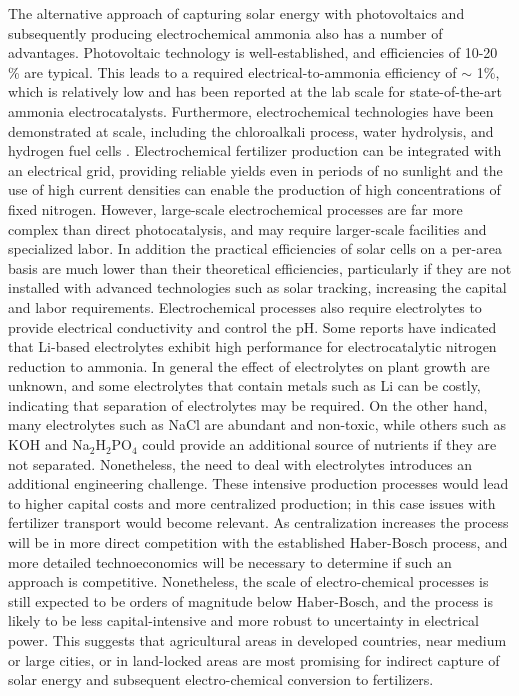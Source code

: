 The alternative approach of capturing solar energy with photovoltaics and subsequently producing electrochemical ammonia also has a number of advantages. Photovoltaic technology is well-established, and efficiencies of 10-20 \% are typical. This leads to a required electrical-to-ammonia efficiency of $\sim$ 1\%, which is relatively low and has been reported at the lab scale for state-of-the-art ammonia electrocatalysts.\cite{Liu2018,Qiu_2018,Song_2018,Zhang_2018,Luo_2018} Furthermore, electrochemical technologies have been demonstrated at scale, including the chloroalkali process, water hydrolysis, and hydrogen fuel cells\cite{Burney1993} \needcite. Electrochemical fertilizer production can be integrated with an electrical grid, providing reliable yields even in periods of no sunlight and the use of high current densities can enable the production of high concentrations of fixed nitrogen. However, large-scale electrochemical processes are far more complex than direct photocatalysis, and may require larger-scale facilities and specialized labor. In addition the practical efficiencies of solar cells on a per-area basis are much lower than their theoretical efficiencies, particularly if they are not installed with advanced technologies such as solar tracking, increasing the capital and labor requirements.\cite{MacKay_2013} Electrochemical processes also require electrolytes to provide electrical conductivity and control the pH. Some reports have indicated that Li-based electrolytes exhibit high performance for electrocatalytic nitrogen reduction to ammonia\cite{Song_2018,Mikosch_2005}. In general the effect of electrolytes on plant growth are unknown, and some electrolytes that contain metals such as Li can be costly, indicating that separation of electrolytes may be required. On the other hand, many electrolytes such as NaCl are abundant and non-toxic, while others such as KOH and Na$_2$H$_2$PO$_4$ could provide an additional source of nutrients if they are not separated. Nonetheless, the need to deal with electrolytes introduces an additional engineering challenge. These intensive production processes would lead to higher capital costs and more centralized production; in this case issues with fertilizer transport would become relevant. As centralization increases the process will be in more direct competition with the established Haber-Bosch process, and more detailed technoeconomics will be necessary to determine if such an approach is competitive. Nonetheless, the scale of electro-chemical processes is still expected to be orders of magnitude below Haber-Bosch, and the process is likely to be less capital-intensive and more robust to uncertainty in electrical power. This suggests that agricultural areas in developed countries, near medium or large cities, or in land-locked areas are most promising for indirect capture of solar energy and subsequent electro-chemical conversion to fertilizers.

